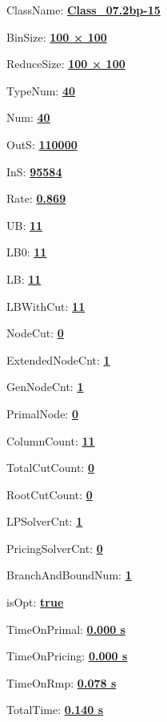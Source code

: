 \documentclass[11pt]{article}
\begin{document}
\pagestyle{empty}


ClassName: \underline{\textbf{Class_07.2bp-15}}
\par
BinSize: \underline{\textbf{100 × 100}}
\par
ReduceSize: \underline{\textbf{100 × 100}}
\par
TypeNum: \underline{\textbf{40}}
\par
Num: \underline{\textbf{40}}
\par
OutS: \underline{\textbf{110000}}
\par
InS: \underline{\textbf{95584}}
\par
Rate: \underline{\textbf{0.869}}
\par
UB: \underline{\textbf{11}}
\par
LB0: \underline{\textbf{11}}
\par
LB: \underline{\textbf{11}}
\par
LBWithCut: \underline{\textbf{11}}
\par
NodeCut: \underline{\textbf{0}}
\par
ExtendedNodeCnt: \underline{\textbf{1}}
\par
GenNodeCnt: \underline{\textbf{1}}
\par
PrimalNode: \underline{\textbf{0}}
\par
ColumnCount: \underline{\textbf{11}}
\par
TotalCutCount: \underline{\textbf{0}}
\par
RootCutCount: \underline{\textbf{0}}
\par
LPSolverCnt: \underline{\textbf{1}}
\par
PricingSolverCnt: \underline{\textbf{0}}
\par
BranchAndBoundNum: \underline{\textbf{1}}
\par
isOpt: \underline{\textbf{true}}
\par
TimeOnPrimal: \underline{\textbf{0.000 s}}
\par
TimeOnPricing: \underline{\textbf{0.000 s}}
\par
TimeOnRmp: \underline{\textbf{0.078 s}}
\par
TotalTime: \underline{\textbf{0.140 s}}
\par
\newpage


\end{document}

